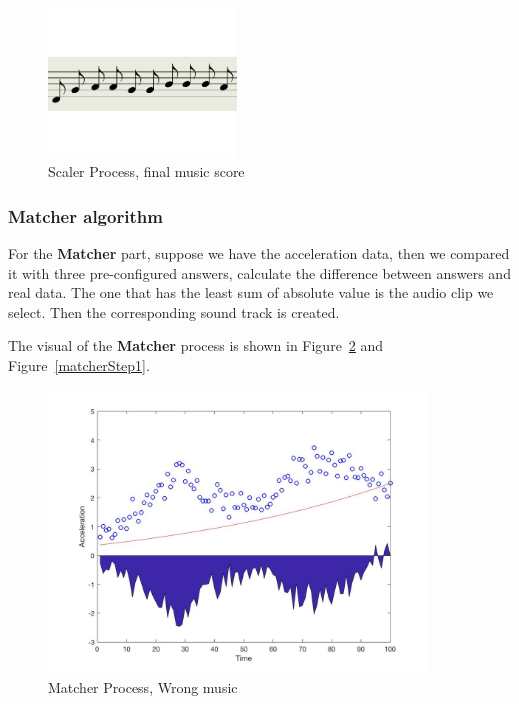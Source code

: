 \begin{figure}[H]
\centering
\newcommand{\widthOfScalerStepFigure}{5cm}
\includegraphics[width=\widthOfScalerStepFigure]{figWR/scaler2}
\caption{Scaler Process, final music score}
\label{scalerStep2}
\end{figure}


\subsubsection{Matcher algorithm}

   For the \textbf{Matcher} part, suppose we have the acceleration data,
   then we compared it with three pre-configured answers,
   calculate the difference between answers and real data.
   The one that has the least sum of absolute value is the audio clip we select.
   Then the corresponding sound track is created.

   The visual of the \textbf{Matcher} process is shown in Figure~\ref{matcherStep0} and Figure~\ref{matcherStep1}.


\newcommand{\widthOfMatcherFigure}{10cm}
\begin{figure}[H]
\centering
\includegraphics[width=\widthOfMatcherFigure]{figWR/matcher1}
\caption{Matcher Process, Wrong music}
\label{matcherStep0}
\end{figure}

